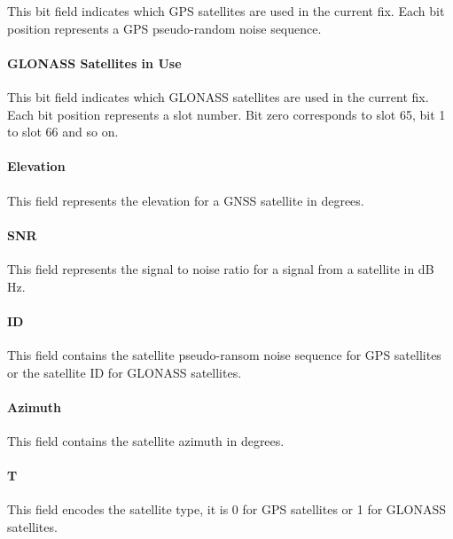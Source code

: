 This bit field indicates which GPS satellites are used in the current fix. Each bit position represents a GPS
pseudo-random noise sequence.

\paragraph{GLONASS Satellites in Use}
This bit field indicates which GLONASS satellites are used in the current fix. Each bit position represents a slot
number. Bit zero corresponds to slot 65, bit 1 to slot 66 and so on.

\paragraph{Elevation}
This field represents the elevation for a GNSS satellite in degrees.

\paragraph{SNR}
This field represents the signal to noise ratio for a signal from a satellite in dB Hz.

\paragraph{ID}
This field contains the satellite pseudo-ransom noise sequence for GPS satellites or the satellite ID for GLONASS
satellites.

\paragraph{Azimuth}
This field contains the satellite azimuth in degrees.

\paragraph{T}
This field encodes the satellite type, it is 0 for GPS satellites or 1 for GLONASS satellites.

